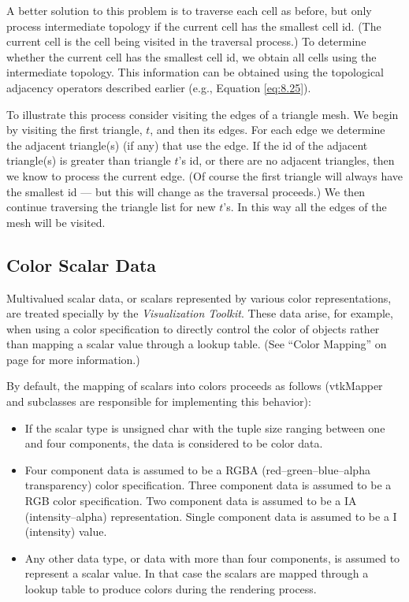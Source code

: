A better solution to this problem is to traverse each cell as before, but only process intermediate topology if the current cell has the smallest cell id. (The current cell is the cell being visited in the traversal process.) To determine whether the current cell has the smallest cell id, we obtain all cells using the intermediate topology. This information can be obtained using the topological adjacency operators described earlier (e.g., Equation \ref{eq:8.25}).

To illustrate this process consider visiting the edges of a triangle mesh. We begin by visiting the first triangle, $t$, and then its edges. For each edge we determine the adjacent triangle(s) (if any) that use the edge. If the id of the adjacent triangle(s) is greater than triangle $t$'s id, or there are no adjacent triangles, then we know to process the current edge. (Of course the first triangle will always have the smallest id  --- but this will change as the traversal proceeds.) We then continue traversing the triangle list for new $t$'s. In this way all the edges of the mesh will be visited.

\subsection{Color Scalar Data}

Multivalued scalar data, or scalars represented by various color representations, are treated specially by the \emph{Visualization Toolkit}. These data arise, for example, when using a color specification to directly control the color of objects rather than mapping a scalar value through a lookup table. (See ``Color Mapping'' on page \pageref{subsec:color_mapping} for more information.)

By default, the mapping of scalars into colors proceeds as follows (vtkMapper and subclasses are responsible for implementing this behavior):
\begin{itemize}

\item If the scalar type is unsigned char with the tuple size ranging between one and four components, the data is considered to be color data.

\item Four component data is assumed to be a RGBA (red--green--blue--alpha transparency) color specification. Three component data is assumed to be a RGB color specification. Two component data is assumed to be a IA (intensity--alpha) representation. Single component data is assumed to be a I (intensity) value.

\item Any other data type, or data with more than four components, is assumed to represent a scalar value. In that case the scalars are mapped through a lookup table to produce colors during the rendering process.

\end{itemize}

